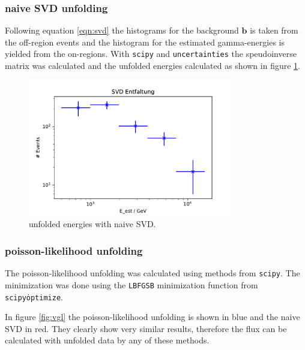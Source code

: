 \subsubsection{naive SVD unfolding}
Following equation \eqref{eqn:svd} the histograms for the background $\symbf{b}$ is taken from the off-region events and the histogram for the estimated gamma-energies is yielded from the on-regions.
With \texttt{scipy} and \texttt{uncertainties} the speudoinverse matrix was calculated and the unfolded energies calculated as shown in figure \ref{fig:svdUnfold}.

\begin{figure}
  \centering
  \includegraphics[width=0.8\textwidth]{plots/NSVD.pdf}
  \caption{unfolded energies with naive SVD.}
  \label{fig:svdUnfold}
\end{figure}

\subsubsection{poisson-likelihood unfolding}
The poisson-likelihood unfolding was calculated using methods from \texttt{scipy}. The minimization was done using the \texttt{L\-BFGS\-B} minimization function from \texttt{scipy\.optimize}.

In figure \ref{fig:vgl} the poisson-likelihood unfolding is shown in blue and the naive SVD in red. They clearly show very similar results, therefore the flux can be calculated with unfolded data by any of these methods.

